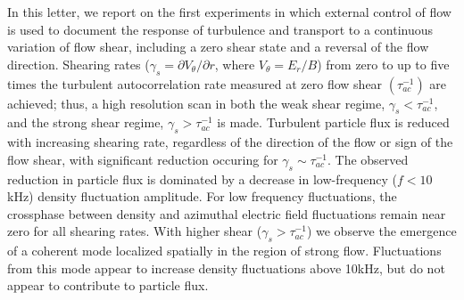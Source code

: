 \documentclass[aps,prl,amsmath,amssymb,preprint,superscriptaddress]{revtex4} %
\begin{document}
In this letter, we report on the first experiments in which external control of flow is used to document the response of turbulence and transport to a continuous variation of flow shear, including a zero shear state and a reversal of the flow direction. Shearing rates ($\gamma_{s}= \partial V_{\theta}/\partial r$, where $V_{\theta} = E_r/B$) from zero to up to five times the turbulent autocorrelation rate measured at zero flow shear $(\tau_{ac}^{-1})$ are achieved; thus, a high resolution scan in both the weak shear regime, $\gamma_{s} < \tau_{ac}^{-1}$, and the strong shear regime, $\gamma_{s} > \tau_{ac}^{-1}$ is made. Turbulent particle flux is reduced with increasing shearing rate, regardless of the direction of the flow or sign of the flow shear, with significant reduction occuring for $\gamma_{s} \sim \tau_{ac}^{-1}$.  The observed reduction in particle flux is dominated by a decrease in low-frequency ($f < 10$kHz) density fluctuation amplitude. For low frequency fluctuations, the crossphase between density and azimuthal electric field fluctuations remain near zero for all shearing rates.  With higher shear ($\gamma_{s} > \tau_{ac}^{-1}$) we observe the emergence of a coherent mode localized spatially in the region of strong flow. Fluctuations from this mode appear to increase density fluctuations above 10kHz, but do not appear to contribute to particle flux.   
\end{document}
